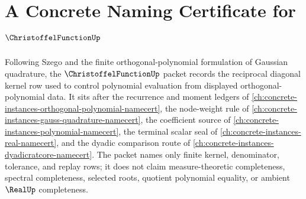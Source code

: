 \chapter{A Concrete Naming Certificate for $\ChristoffelFunctionUp$}
\label{ch:concrete-instances-christoffel-function-namecert}

Following Szego and the finite orthogonal-polynomial formulation of Gaussian quadrature, the $\ChristoffelFunctionUp$ packet records the reciprocal diagonal kernel row used to control polynomial evaluation from displayed orthogonal-polynomial data. It sits after the recurrence and moment ledgers of \autoref{ch:concrete-instances-orthogonal-polynomial-namecert}, the node-weight rule of \autoref{ch:concrete-instances-gauss-quadrature-namecert}, the coefficient source of \autoref{ch:concrete-instances-polynomial-namecert}, the terminal scalar seal of \autoref{ch:concrete-instances-real-namecert}, and the dyadic comparison route of \autoref{ch:concrete-instances-dyadicratcore-namecert}. The packet names only finite kernel, denominator, tolerance, and replay rows; it does not claim measure-theoretic completeness, spectral completeness, selected roots, quotient polynomial equality, or ambient $\RealUp$ completeness.

